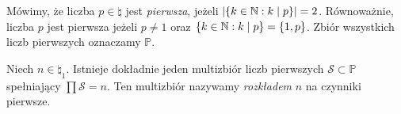 \begin{definition}
	Mówimy, że liczba \(p \in \natural\) jest \textit{pierwsza},
	jeżeli \(\card{\set{k \in \natural : k \mid p}} = 2\).
	Równoważnie, liczba \(p\) jest pierwsza jeżeli \(p \neq 1\) oraz
	\(\set{k \in \natural : k \mid p} = \set{1, p}\).
	Zbiór wszystkich liczb pierwszych oznaczamy \(\mathbb P\).
\end{definition}

\begin{theorem}
	\label{nt:fundamentalne}
	Niech \(n \in \natural_1\). Istnieje dokładnie jeden multizbiór
	liczb pierwszych \(\mathcal S \subset \mathbb P\) spełniający
	\(\prod \mathcal S = n\). Ten multizbiór nazywamy \textit{rozkładem} \(n\) na czynniki pierwsze.
\end{theorem}

